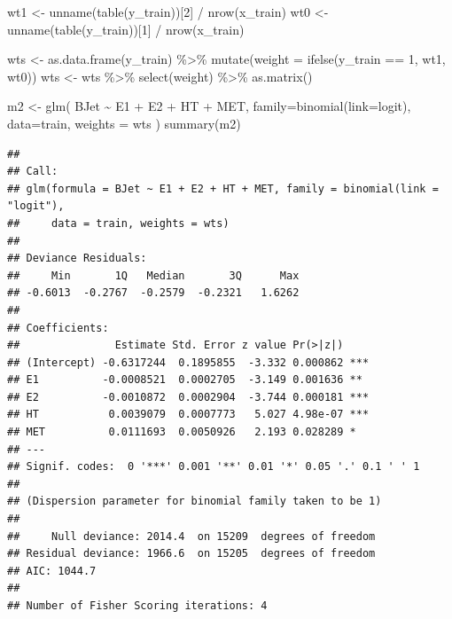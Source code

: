 \documentclass[
]{article}
\newenvironment{Shaded}{\begin{snugshade}}{\end{snugshade}}
\newcommand{\AttributeTok}[1]{\textcolor[rgb]{0.77,0.63,0.00}{#1}}
\newcommand{\DecValTok}[1]{\textcolor[rgb]{0.00,0.00,0.81}{#1}}
\newcommand{\FunctionTok}[1]{\textcolor[rgb]{0.00,0.00,0.00}{#1}}
\newcommand{\NormalTok}[1]{#1}
\newcommand{\OtherTok}[1]{\textcolor[rgb]{0.56,0.35,0.01}{#1}}
\newcommand{\SpecialCharTok}[1]{\textcolor[rgb]{0.00,0.00,0.00}{#1}}
\newcommand{\StringTok}[1]{\textcolor[rgb]{0.31,0.60,0.02}{#1}}
\begin{document}
\begin{Shaded}
\begin{Highlighting}[]
\NormalTok{wt1 }\OtherTok{\textless{}{-}} \FunctionTok{unname}\NormalTok{(}\FunctionTok{table}\NormalTok{(y\_train))[}\DecValTok{2}\NormalTok{] }\SpecialCharTok{/} \FunctionTok{nrow}\NormalTok{(x\_train)}
\NormalTok{wt0 }\OtherTok{\textless{}{-}} \FunctionTok{unname}\NormalTok{(}\FunctionTok{table}\NormalTok{(y\_train))[}\DecValTok{1}\NormalTok{] }\SpecialCharTok{/} \FunctionTok{nrow}\NormalTok{(x\_train)}

\NormalTok{wts }\OtherTok{\textless{}{-}} \FunctionTok{as.data.frame}\NormalTok{(y\_train) }\SpecialCharTok{\%\textgreater{}\%} 
  \FunctionTok{mutate}\NormalTok{(}\AttributeTok{weight =} \FunctionTok{ifelse}\NormalTok{(y\_train }\SpecialCharTok{==} \DecValTok{1}\NormalTok{, wt1, wt0))}
\NormalTok{wts }\OtherTok{\textless{}{-}}\NormalTok{ wts }\SpecialCharTok{\%\textgreater{}\%}
  \FunctionTok{select}\NormalTok{(weight) }\SpecialCharTok{\%\textgreater{}\%} \FunctionTok{as.matrix}\NormalTok{()}

\NormalTok{m2 }\OtherTok{\textless{}{-}} \FunctionTok{glm}\NormalTok{(}
\NormalTok{  BJet }\SpecialCharTok{\textasciitilde{}}\NormalTok{ E1 }\SpecialCharTok{+}\NormalTok{ E2 }\SpecialCharTok{+}\NormalTok{ HT }\SpecialCharTok{+}\NormalTok{ MET, }
  \AttributeTok{family=}\FunctionTok{binomial}\NormalTok{(}\AttributeTok{link=}\StringTok{\textquotesingle{}logit\textquotesingle{}}\NormalTok{), }
  \AttributeTok{data=}\NormalTok{train,}
  \AttributeTok{weights =}\NormalTok{ wts}
\NormalTok{)}
\FunctionTok{summary}\NormalTok{(m2)}
\end{Highlighting}
\end{Shaded}

\begin{verbatim}
## 
## Call:
## glm(formula = BJet ~ E1 + E2 + HT + MET, family = binomial(link = "logit"), 
##     data = train, weights = wts)
## 
## Deviance Residuals: 
##     Min       1Q   Median       3Q      Max  
## -0.6013  -0.2767  -0.2579  -0.2321   1.6262  
## 
## Coefficients:
##               Estimate Std. Error z value Pr(>|z|)    
## (Intercept) -0.6317244  0.1895855  -3.332 0.000862 ***
## E1          -0.0008521  0.0002705  -3.149 0.001636 ** 
## E2          -0.0010872  0.0002904  -3.744 0.000181 ***
## HT           0.0039079  0.0007773   5.027 4.98e-07 ***
## MET          0.0111693  0.0050926   2.193 0.028289 *  
## ---
## Signif. codes:  0 '***' 0.001 '**' 0.01 '*' 0.05 '.' 0.1 ' ' 1
## 
## (Dispersion parameter for binomial family taken to be 1)
## 
##     Null deviance: 2014.4  on 15209  degrees of freedom
## Residual deviance: 1966.6  on 15205  degrees of freedom
## AIC: 1044.7
## 
## Number of Fisher Scoring iterations: 4
\end{verbatim}
\end{document}
